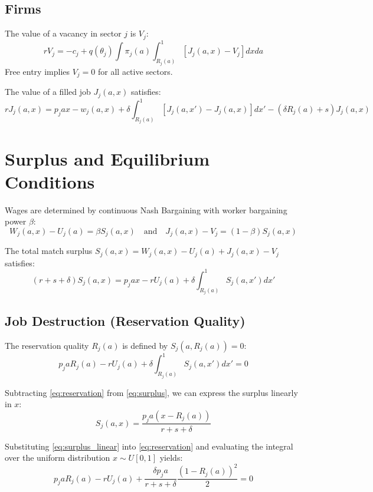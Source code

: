 \documentclass[11pt]{article}
\begin{document}
\subsection{Firms}
The value of a vacancy in sector $j$ is $V_j$:
\begin{equation}
r V_j = -c_j + q(\theta_j) \int \pi_j(a) \int_{R_j(a)}^1 [J_j(a, x) - V_j] dx da
\end{equation}
Free entry implies $V_j = 0$ for all active sectors.

The value of a filled job $J_j(a, x)$ satisfies:
\begin{equation}
r J_j(a, x) = p_j a x - w_j(a, x) + \delta \int_{R_j(a)}^1 [J_j(a, x') - J_j(a, x)] dx' - (\delta R_j(a) + s) J_j(a, x)
\end{equation}

\section{Surplus and Equilibrium Conditions}
Wages are determined by continuous Nash Bargaining with worker bargaining power $\beta$:
\begin{equation}
W_j(a, x) - U_j(a) = \beta S_j(a, x) \quad \text{and} \quad J_j(a, x) - V_j = (1-\beta) S_j(a, x)
\end{equation}

The total match surplus $S_j(a, x) = W_j(a, x) - U_j(a) + J_j(a, x) - V_j$ satisfies:
\begin{equation} \label{eq:surplus}
(r + s + \delta) S_j(a, x) = p_j a x - r U_j(a) + \delta \int_{R_j(a)}^1 S_j(a, x') dx'
\end{equation}

\subsection{Job Destruction (Reservation Quality)}
The reservation quality $R_j(a)$ is defined by $S_j(a, R_j(a)) = 0$:
\begin{equation} \label{eq:reservation}
p_j a R_j(a) - r U_j(a) + \delta \int_{R_j(a)}^1 S_j(a, x') dx' = 0
\end{equation}

Subtracting \eqref{eq:reservation} from \eqref{eq:surplus}, we can express the surplus linearly in $x$:
\begin{equation} \label{eq:surplus_linear}
S_j(a, x) = \frac{p_j a (x - R_j(a))}{r + s + \delta}
\end{equation}

Substituting \eqref{eq:surplus_linear} into \eqref{eq:reservation} and evaluating the integral over the uniform distribution $x \sim U[0,1]$ yields:
\begin{equation} \label{eq:reservation_explicit}
p_j a R_j(a) - r U_j(a) + \frac{\delta p_j a}{r + s + \delta} \frac{(1 - R_j(a))^2}{2} = 0
\end{equation}
\end{document}
